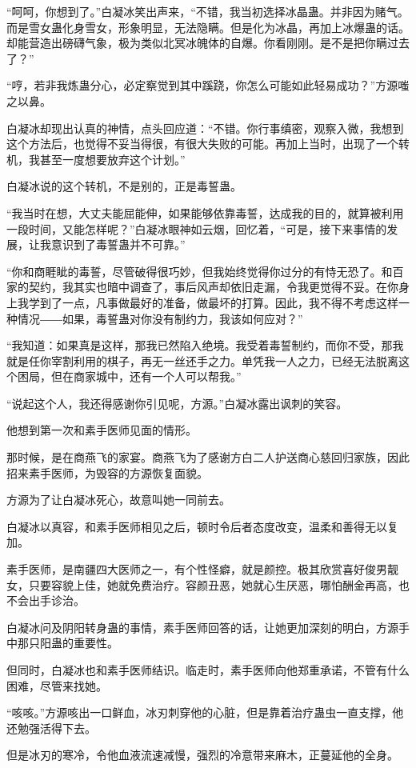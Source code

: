 \begin{this_body}
“呵呵，你想到了。”白凝冰笑出声来，“不错，我当初选择冰晶蛊。并非因为赌气。而是雪女蛊化身雪女，形象明显，无法隐瞒。但是化为冰晶，再加上冰爆蛊的话。却能营造出磅礴气象，极为类似北冥冰魄体的自爆。你看刚刚。是不是把你瞒过去了？”

“哼，若非我炼蛊分心，必定察觉到其中蹊跷，你怎么可能如此轻易成功？”方源嗤之以鼻。

白凝冰却现出认真的神情，点头回应道：“不错。你行事缜密，观察入微，我想到这个方法后，也觉得不妥当得很，有很大失败的可能。再加上当时，出现了一个转机，我甚至一度想要放弃这个计划。”

白凝冰说的这个转机，不是别的，正是毒誓蛊。

“我当时在想，大丈夫能屈能伸，如果能够依靠毒誓，达成我的目的，就算被利用一段时间，又能怎样呢？”白凝冰眼神如云烟，回忆着，“可是，接下来事情的发展，让我意识到了毒誓蛊并不可靠。”

“你和商睚眦的毒誓，尽管破得很巧妙，但我始终觉得你过分的有恃无恐了。和百家的契约，我其实也暗中调查了，事后风声却依旧走漏，令我更觉得不妥。在你身上我学到了一点，凡事做最好的准备，做最坏的打算。因此，我不得不考虑这样一种情况――如果，毒誓蛊对你没有制约力，我该如何应对？”

“我知道：如果真是这样，那我已然陷入绝境。我受着毒誓制约，而你不受，那我就是任你宰割利用的棋子，再无一丝还手之力。单凭我一人之力，已经无法脱离这个困局，但在商家城中，还有一个人可以帮我。”

“说起这个人，我还得感谢你引见呢，方源。”白凝冰露出讽刺的笑容。

他想到第一次和素手医师见面的情形。

那时候，是在商燕飞的家宴。商燕飞为了感谢方白二人护送商心慈回归家族，因此招来素手医师，为毁容的方源恢复面貌。

方源为了让白凝冰死心，故意叫她一同前去。

白凝冰以真容，和素手医师相见之后，顿时令后者态度改变，温柔和善得无以复加。

素手医师，是南疆四大医师之一，有个性怪癖，就是颜控。极其欣赏喜好俊男靓女，只要容貌上佳，她就免费治疗。容颜丑恶，她就心生厌恶，哪怕酬金再高，也不会出手诊治。

白凝冰问及阴阳转身蛊的事情，素手医师回答的话，让她更加深刻的明白，方源手中那只阳蛊的重要性。

但同时，白凝冰也和素手医师结识。临走时，素手医师向他郑重承诺，不管有什么困难，尽管来找她。

“咳咳。”方源咳出一口鲜血，冰刃刺穿他的心脏，但是靠着治疗蛊虫一直支撑，他还勉强活得下去。

但是冰刃的寒冷，令他血液流速减慢，强烈的冷意带来麻木，正蔓延他的全身。


\end{this_body}
